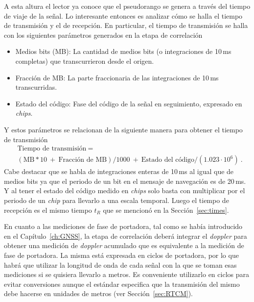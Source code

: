\documentclass[a4paper,12pt,oneside,onecolumn,final,openright]{book}%
\begin{document}
	A esta altura el lector ya conoce que el pseudorango se genera a través del tiempo de viaje de la señal. Lo interesante entonces es analizar cómo se halla el tiempo de transmisión y el de recepción. En particular, el tiempo de transmisión se halla con los siguientes parámetros generados en la etapa de correlación
\begin{itemize}
	\item Medios bits (MB): La cantidad de medios bits (o integraciones de 10\,ms completas) que transcurrieron desde el origen. 
	\item Fracción de MB: La parte fraccionaria de las integraciones de 10\,ms transcurridas.
	\item Estado del código: Fase del código de la señal en seguimiento, expresado en \textit{chips}.
\end{itemize}
	Y estos parámetros se relacionan de la siguiente manera para obtener el tiempo de transmisión
\begin{align}
	&\text{Tiempo de transmisión} \ = \\ &\left(\text{MB}*10 \ + \ \text{Fracción de MB} \right)/1000 \ + \ \text{Estado del código}/(1.023\cdot 10^6) \ \nonumber.
\end{align}
	Cabe destacar que se habla de integraciones enteras de 10\,ms al igual que de medios bits ya que el periodo de un bit en el mensaje de navegación es de 20\,ms. Y al tener el estado del código medido en \textit{chips} solo basta con multiplicar por el periodo de un \textit{chip} para llevarlo a una escala temporal. Luego el tiempo de recepción es el mismo tiempo $t_R$ que se mencionó en la Sección~\ref{sec:times}.
	
	En cuanto a las mediciones de fase de portadora, tal como se había introducido en el Capítulo~\ref{ch:GNSS}, la etapa de correlación deberá integrar el \textit{doppler} para obtener una medición de \textit{doppler} acumulado que es equivalente a la medición de fase de portadora. La misma está expresada en ciclos de portadora, por lo que habrá que utilizar la longitud de onda de cada señal con la que se toman esas mediciones si se quisiera llevarlo a metros. Es conveniente utilizarlo en ciclos para evitar conversiones aunque el estándar especifica que la transmisión del mismo debe hacerse en unidades de metros (ver Sección~\ref{sec:RTCM}).
\end{document}
